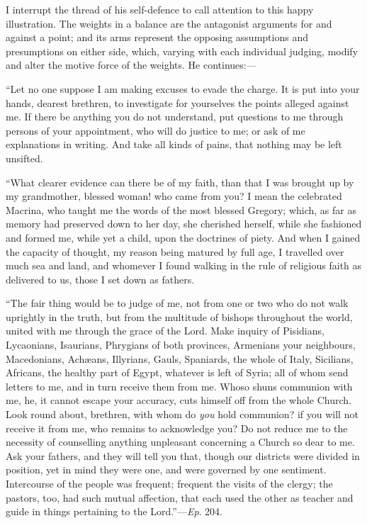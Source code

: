 I interrupt the thread of his self-defence to call attention to
this happy illustration. The weights in a balance are the antagonist
arguments for and against a point; and its arms represent the opposing
assumptions and presumptions on either side, which, varying with each
individual judging, modify and alter the motive force of the weights.
He continues:—

``Let no one suppose I am making excuses to evade the charge.
It is put into your hands, dearest brethren, to investigate for
yourselves the points alleged against me. If there be anything you do
not understand, put questions to me through persons of your
appointment, who will do justice to me; or ask of me explanations in
writing. And take all kinds of pains, that nothing may be left
unsifted.

``What clearer evidence can there be of my faith, than that I
was brought up by my grandmother, blessed woman! who came from you? I
mean the celebrated Macrina, who taught me the words of the most
blessed Gregory; which, as far as memory had preserved down to her
day, she cherished herself, while she fashioned and formed me, while
yet a child, upon the doctrines of piety. And when I gained the
capacity of thought, my reason being matured by full age, I travelled
over much sea and land, and whomever I found walking in the rule of
religious faith as delivered to us, those I set down as fathers.

``The fair thing would be to judge of me, not from one or two who do not walk uprightly in the truth, but from the multitude of
bishops throughout the world, united with me through the grace of the
Lord. Make inquiry of Pisidians, Lycaonians, Isaurians, Phrygians of
both provinces, Armenians your neighbours, Macedonians, Achæans,
Illyrians, Gauls, Spaniards, the whole of Italy, Sicilians, Africans,
the healthy part of Egypt, whatever is left of Syria; all of whom send
letters to me, and in turn receive them from me. Whoso shuns communion
with me, he, it cannot escape your accuracy, cuts himself off from the
whole Church. Look round about, brethren, with whom do \emph{you} hold
communion? if you will not receive it from me, who remains to
acknowledge you? Do not reduce me to the necessity of counselling
anything unpleasant concerning a Church so dear to me. Ask your
fathers, and they will tell you that, though our districts were
divided in position, yet in mind they were one, and were governed by
one sentiment. Intercourse of the people was frequent; frequent the
visits of the clergy; the pastors, too, had such mutual affection,
that each used the other as teacher and guide in things pertaining to
the Lord.''—\emph{Ep}. 204.

